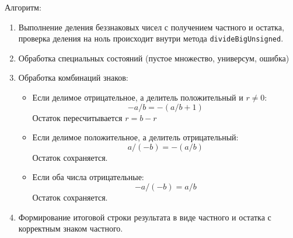 Алгоритм:
\begin{enumerate}
\item Выполнение деления беззнаковых чисел с получением частного и остатка, проверка деления на ноль происходит внутри метода \texttt{divideBigUnsigned}.

\item Обработка специальных состояний (пустое множество, универсум, ошибка)

\item Обработка комбинаций знаков:
\begin{itemize}
    \item Если делимое отрицательное, а делитель положительный и $r \ne 0$:
    \[
    -a / b = -(a / b + 1)
    \]
    Остаток пересчитывается $r = b - r$
    
    \item Если делимое положительное, а делитель отрицательный:
    \[
    a / (-b) = -(a/b)
    \]
    Остаток сохраняется.
    
    \item Если оба числа отрицательные:
    \[
    -a / (-b) = a/b
    \]
    Остаток сохраняется.
\end{itemize}

\item Формирование итоговой строки результата в виде частного и остатка с корректным знаком частного.

\end{enumerate}

\newpage